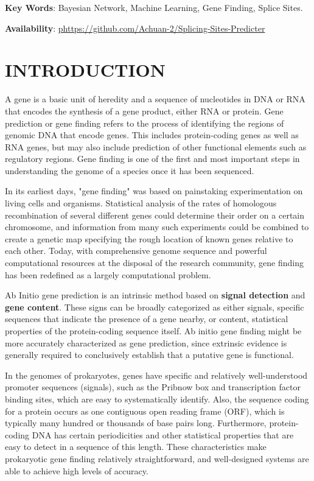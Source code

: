 \documentclass{gapd}
\begin{document}
\maketitle

\textbf{Key Words}: Bayesian Network, Machine Learning, Gene Finding, Splice Sites.

\textbf{Availability}: \href{https://github.com/pgmpy}{phttps://github.com/Achuan-2/Splicing-Sites-Predicter}

\section{INTRODUCTION}\label{introduction}

A gene is a basic unit of heredity and a sequence of nucleotides in DNA
or RNA that encodes the synthesis of a gene product, either RNA or
protein. Gene prediction or gene finding refers to the process of
identifying the regions of genomic DNA that encode genes. This includes
protein-coding genes as well as RNA genes, but may also include
prediction of other functional elements such as regulatory regions. Gene
finding is one of the first and most important steps in understanding
the genome of a species once it has been sequenced.

In its earliest days, "gene finding" was based on painstaking
experimentation on living cells and organisms. Statistical analysis of
the rates of homologous recombination of several different genes could
determine their order on a certain chromosome, and information from many
such experiments could be combined to create a genetic map specifying
the rough location of known genes relative to each other. Today, with
comprehensive genome sequence and powerful computational resources at
the disposal of the research community, gene finding has been redefined
as a largely computational problem.

Ab Initio gene prediction is an intrinsic method based on \textbf{signal
detection} and \textbf{gene content}. These signs can be broadly
categorized as either signals, specific sequences that indicate the
presence of a gene nearby, or content, statistical properties of the
protein-coding sequence itself. Ab initio gene finding might be more
accurately characterized as gene prediction, since extrinsic evidence is
generally required to conclusively establish that a putative gene is
functional.

In the genomes of prokaryotes, genes have specific and relatively
well-understood promoter sequences (signals), such as the Pribnow box
and transcription factor binding sites, which are easy to systematically
identify. Also, the sequence coding for a protein occurs as one
contiguous open reading frame (ORF), which is typically many hundred or
thousands of base pairs long. Furthermore, protein-coding DNA has
certain periodicities and other statistical properties that are easy to
detect in a sequence of this length. These characteristics make
prokaryotic gene finding relatively straightforward, and well-designed
systems are able to achieve high levels of accuracy.
\end{document}
